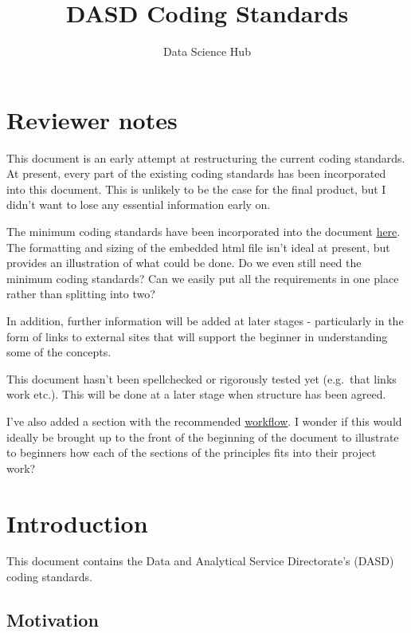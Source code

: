 \documentclass[]{book}
\title{DASD Coding Standards}
\author{Data Science Hub}
\date{}
\begin{document}
\maketitle

{
\setcounter{tocdepth}{1}
\tableofcontents
}
\hypertarget{reviewer-notes}{%
\chapter{Reviewer notes}\label{reviewer-notes}}

This document is an early attempt at restructuring the current coding standards. At present, every part of the existing coding standards has been incorporated into this document. This is unlikely to be the case for the final product, but I didn't want to lose any essential information early on.

The minimum coding standards have been incorporated into the document \protect\hyperlink{mcstable}{here}. The formatting and sizing of the embedded html file isn't ideal at present, but provides an illustration of what could be done. Do we even still need the minimum coding standards? Can we easily put all the requirements in one place rather than splitting into two?

In addition, further information will be added at later stages - particularly in the form of links to external sites that will support the beginner in understanding some of the concepts.

This document hasn't been spellchecked or rigorously tested yet (e.g.~that links work etc.). This will be done at a later stage when structure has been agreed.

I've also added a section with the recommended \protect\hyperlink{wf}{workflow}. I wonder if this would ideally be brought up to the front of the beginning of the document to illustrate to beginners how each of the sections of the principles fits into their project work?

\hypertarget{intro}{%
\chapter{Introduction}\label{intro}}

This document contains the Data and Analytical Service Directorate's (DASD) coding standards.

\hypertarget{motivation}{%
\section{Motivation}\label{motivation}}
\end{document}
